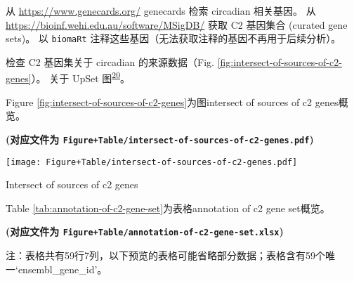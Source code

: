 \documentclass[
]{article}
\begin{document}
从 \url{https://www.genecards.org/} genecards 检索 circadian 相关基因。
从 \url{https://bioinf.wehi.edu.au/software/MSigDB/} 获取 C2 基因集合 (curated gene sets)。
以 \texttt{biomaRt} 注释这些基因（无法获取注释的基因不再用于后续分析）。

检查 C2 基因集关于 circadian 的来源数据（Fig. \ref{fig:intersect-of-sources-of-c2-genes}）。
关于 UpSet 图\textsuperscript{\protect\hyperlink{ref-SetsAndIntersLexA2014}{20}}。

Figure \ref{fig:intersect-of-sources-of-c2-genes}为图intersect of sources of c2 genes概览。

\textbf{(对应文件为 \texttt{Figure+Table/intersect-of-sources-of-c2-genes.pdf})}

\def\@captype{figure}
\begin{center}
\texttt{[image: Figure+Table/intersect-of-sources-of-c2-genes.pdf]}
\caption{Intersect of sources of c2 genes}\label{fig:intersect-of-sources-of-c2-genes}
\end{center}

Table \ref{tab:annotation-of-c2-gene-set}为表格annotation of c2 gene set概览。

\textbf{(对应文件为 \texttt{Figure+Table/annotation-of-c2-gene-set.xlsx})}

\begin{center}\begin{tcolorbox}[colback=gray!10, colframe=gray!50, width=0.9\linewidth, arc=1mm, boxrule=0.5pt]注：表格共有59行7列，以下预览的表格可能省略部分数据；表格含有59个唯一`ensembl\_gene\_id'。
\end{tcolorbox}
\end{center}
\end{document}
